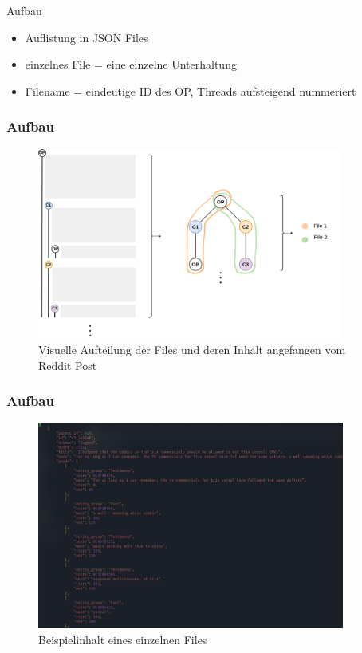 \documentclass[compress,12pt]{beamer}
\begin{document}
    \begin{frame}{Aufbau}
        \begin{itemize}
            \item Auflistung in JSON Files
            \item einzelnes File = eine einzelne Unterhaltung
            \item Filename = eindeutige ID des OP, Threads aufsteigend nummeriert
        \end{itemize}
    \end{frame}

    \begin{frame}[plain]
        \frametitle{Aufbau}
        \begin{figure}
            \centering
            \includegraphics[width=0.9\textwidth]{../images/data-files-structure}
            \caption{Visuelle Aufteilung der Files und deren Inhalt angefangen vom Reddit Post}
            \label{fig:data-structure}
        \end{figure}
    \end{frame}

    \begin{frame}[plain]
        \frametitle{Aufbau}
        \begin{figure}
            \centering
            \includegraphics[width=0.9\textwidth]{../images/single-file-example}
            \caption{Beispielinhalt eines einzelnen Files}
            \label{fig:single-file-example}
        \end{figure}
    \end{frame}
\end{document}
